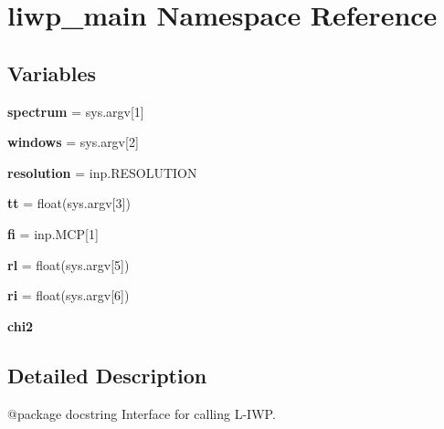 \hypertarget{namespaceliwp__main}{}\section{liwp\+\_\+main Namespace Reference}
\label{namespaceliwp__main}
\subsection*{Variables}
\begin{DoxyCompactItemize}
\item 
\mbox{\label{namespaceliwp__main_aafea26f66ec51c9c4751a6e7e8114694}} 
{\bfseries spectrum} = sys.\+argv\mbox{[}1\mbox{]}
\item 
\mbox{\label{namespaceliwp__main_a8aec7ba10b128e7bd03acbfa313787c1}} 
{\bfseries windows} = sys.\+argv\mbox{[}2\mbox{]}
\item 
\mbox{\label{namespaceliwp__main_aa7afd1dfd6541dcca66bd65cee213595}} 
{\bfseries resolution} = inp.\+R\+E\+S\+O\+L\+U\+T\+I\+ON
\item 
\mbox{\label{namespaceliwp__main_aacd7f28e609970ca7c0f33f6928559fa}} 
{\bfseries tt} = float(sys.\+argv\mbox{[}3\mbox{]})
\item 
\mbox{\label{namespaceliwp__main_a4481be809be377886ff7a0a4f99f0cc6}} 
{\bfseries fi} = inp.\+M\+CP\mbox{[}1\mbox{]}
\item 
\mbox{\label{namespaceliwp__main_ab178fd37134b69182727f289c3d6a729}} 
{\bfseries rl} = float(sys.\+argv\mbox{[}5\mbox{]})
\item 
\mbox{\label{namespaceliwp__main_a8dd97364cc63586e8828fcfd3c2b1635}} 
{\bfseries ri} = float(sys.\+argv\mbox{[}6\mbox{]})
\item 
\mbox{\label{namespaceliwp__main_a7d46845a9523f82d2f3b2c8c3a3c6a81}} 
{\bfseries chi2}
\end{DoxyCompactItemize}


\subsection{Detailed Description}
\begin{DoxyVerb}@package docstring
Interface for calling L-IWP. 
\end{DoxyVerb}
 